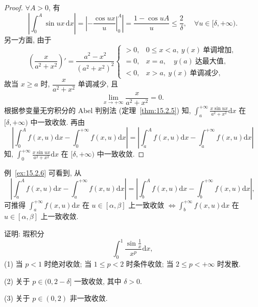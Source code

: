 \begin{proof}
$\forall A>0$, 有
\[
  \left|\int_{0}^{A}\sin ux\,\mathrm{d}x\right|=\left|-\frac{\cos ux}{u}\right|_{0}^{A}\left|=\frac{1-\cos uA}{u}\leqslant\frac{2}{\delta},\quad\forall u\in[\delta,+\infty).
\]
另一方面, 由于
\[
  \left(\frac{x}{a^{2}+x^{2}}\right)'=\frac{a^{2}-x^{2}}{(a^{2}+x^{2})^{2}}\begin{cases}
    >0, & 0\leqslant x<a,\ y(x)\ \text{单调增加},\\
    =0, & x=a,\quad y(a)\ \text{达最大值},\\
    <0, & x>a,\ y(x)\ \text{单调减少},
\end{cases}
\]
故当 $x\geqslant a$ 时, $\dfrac{x}{a^{2}+x^{2}}$ 单调减少, 且
\[
  \lim_{x\to+\infty}\frac{x}{a^{2}+x^{2}}=0.
\]
根据参变量无穷积分的 Abel 判别法 (定理~\ref{thm:15.2.5}) 知, $\displaystyle\int_{a}^{+\infty}\frac{x\sin ux}{a^{2}+x^{2}}\mathrm{d}x$ 在 $[\delta,+\infty)$ 中一致收敛. 再由
\[
  \left|\int_{0}^{A}f(x,u)\mathrm{d}x-\int_{0}^{+\infty}f(x,u)\mathrm{d}x\right|=\left|\int_{a}^{A}f(x,u)\mathrm{d}x-\int_{a}^{+\infty}f(x,u)\mathrm{d}x\right|
\]
知, $\displaystyle\int_{0}^{+\infty}\frac{x\sin ux}{a^{2}+x^{2}}\mathrm{d}x$ 在 $[\delta,+\infty)$ 中一致收敛.
\end{proof}

\begin{remark}\label{rem:15.2.1}
例~\ref{ex:15.2.6} 可看到, 从
\[
  \left|\int_{a}^{A}f(x,u)\mathrm{d}x-\int_{a}^{+\infty}f(x,u)\mathrm{d}x\right|=\left|\int_{b}^{A}f(x,u)\mathrm{d}x-\int_{b}^{+\infty}f(x,u)\mathrm{d}x\right|,
\]
可推得
$\displaystyle\int_{a}^{+\infty}f(x,u)\mathrm{d}x$ 在 $u\in[\alpha,\beta]$ 上一致收敛 $\Leftrightarrow\displaystyle\int_{b}^{+\infty}f(x,u)\mathrm{d}x$ 在 $u\in[\alpha,\beta]$ 上一致收敛.
\end{remark}

\begin{example}\label{ex:15.2.7}
证明: 瑕积分
\[
  \int_{0}^{1}\frac{\sin\frac{1}{x}}{x^{p}}\mathrm{d}x,
\]
(1) 当 $p<1$ 时绝对收敛; 当 $1\leqslant p<2$ 时条件收敛; 当 $2\leqslant p<+\infty$ 时发散.

(2) 关于 $p\in(0,2-\delta]$ 一致收敛, 其中 $\delta>0$.

(3) 关于 $p\in(0,2)$ 非一致收敛.
\end{example}

